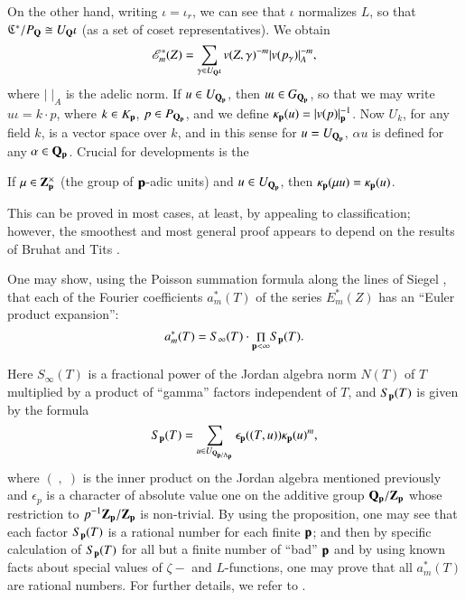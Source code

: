 On the other hand, writing $\iota = \iota_r$, we can see that $\iota$ normalizes $L$, so that $\mathfrak{C}^{\ast}/P_{\mathbf{Q}} \cong U_{\mathbf{Q}}\iota$ (as a set of coset representatives). We obtain
\begin{equation}
\mathscr{E}^\ast_m (Z) = \sum_{\gamma \in U_{\mathbf{Q}}\iota} v (Z, \gamma)^{-m} |v(p_{\gamma})|^{-m}_A, \label{art1-eq3}
\end{equation}\pageoriginale
where $|\;|_A$ is the adelic norm. If $u \in U_{\mathbf{Q}_{\mathbf{p}}}$, then $u \iota \in G_{\mathbf{Q}_{\mathbf{p}}}$, so that we may write $u \iota = k \cdot p$, where $k \in K_{\mathbf{p}}$, $p \in P_{\mathbf{Q}_{\mathbf{p}}}$, and we define $\kappa_{\mathbf{p}} (u) = |v (p)|^{-1}_{\mathbf{p}}$. Now $U_k$, for any field $k$, is a vector space over $k$, and in this sense for $u = U_{\mathbf{Q}_{\mathbf{p}}}$, $\alpha u$ is defined for any $\alpha \in \mathbf{Q}_{\mathbf{p}}$. Crucial for developments is the

\begin{prop*}
If $\mu \in \mathbf{Z}^{\times}_{\mathbf{p}}$ (the group of $\mathbf{p}$-adic units) and $u \in U_{\mathbf{Q}_{\mathbf{p}}}$, then $\kappa_{\mathbf{p}}(\mu u) = \kappa_{\mathbf{p}} (u)$.
\end{prop*}

This can be proved in most cases, at least, by appealing to classification; however, the smoothest and most general proof  \cite{art1-key8} appears to depend on the results of Bruhat and Tits  \cite{art1-key5,art1-key9}.

One may show, using the Poisson summation formula along the lines of Siegel  \cite{art1-key10}, that each of the Fourier coefficients $a^{\ast}_m (T)$ of the series $E^{\ast}_m (Z)$ has an ``Euler product expansion'':
$$
a^\ast_m (T) = S_{\infty} (T) \cdot {\displaystyle{\mathop{\Pi}\limits_{\mathbf{p}< \infty}}} S_{\mathbf{p}} (T).
$$

Here $S_{\infty} (T)$ is a fractional power of the Jordan algebra norm $N (T)$ of $T$ multiplied by a product of ``gamma'' factors independent of $T$, and $S_{\mathbf{p}}(T)$ is given by the formula
$$
S_{\mathbf{p}} (T) = \sum\limits_{u \in U_{\mathbf{Q}_{\mathbf{p}/\Lambda_{\mathbf{p}}}}} \epsilon_{\mathbf{p}} ((T, u)) \kappa_{\mathbf{p}} (u)^m,
$$
where $(\;,\;)$ is the inner product on the Jordan algebra mentioned previously and $\epsilon_p$ is a character of absolute value one on the additive group $\mathbf{Q}_{\mathbf{p}}/\mathbf{Z}_{\mathbf{p}}$ whose restriction to $p^{-1} \mathbf{Z}_{\mathbf{p}}/\mathbf{Z}_{\mathbf{p}}$ is non-trivial. By using the proposition, one may see that each factor $S_{\mathbf{p}}(T)$ is a rational number for each finite $\mathbf{p}$; and then by specific calculation of $S_{\mathbf{p}}(T)$ for all but a finite number of ``bad'' $\mathbf{p}$ and by using known facts about special values of $\zeta-$ and $L$-functions, one may prove that all $a^{\ast}_m (T)$ are rational numbers. For further details, we refer to \cite{art1-key8,art1-key3}.

